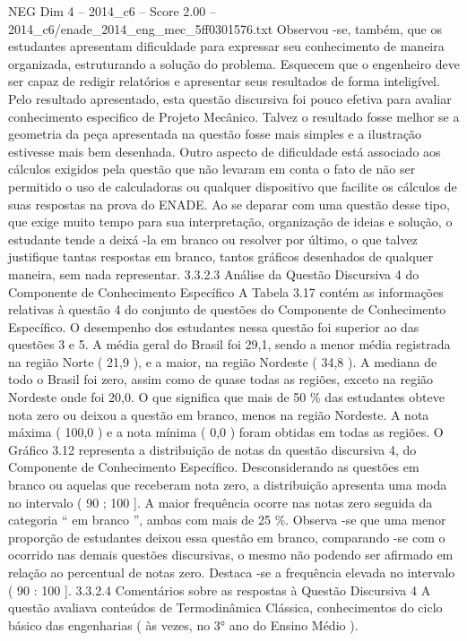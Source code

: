 \begin{textsample}{NEG Dim 4 – 2014\_c6 – Score 2.00 – 2014\_c6/enade\_2014\_eng\_mec\_5ff0301576.txt}
Observou -se, também, que os estudantes apresentam dificuldade para expressar seu conhecimento de maneira organizada, estruturando a solução do problema.
Esquecem que o engenheiro deve ser capaz de redigir relatórios e apresentar seus resultados de forma inteligível.
Pelo resultado apresentado, esta questão discursiva foi pouco efetiva para avaliar conhecimento especifico de Projeto Mecânico.
Talvez o resultado fosse melhor se a geometria da peça apresentada na questão fosse mais simples e a ilustração estivesse mais bem desenhada.
Outro aspecto de dificuldade está associado aos cálculos exigidos pela questão que não levaram em conta o fato de não ser permitido o uso de calculadoras ou qualquer dispositivo que facilite os cálculos de suas respostas na prova do ENADE.
Ao se deparar com uma questão desse tipo, que exige muito tempo para sua interpretação, organização de ideias e solução, o estudante tende a deixá -la em branco ou resolver por último, o que talvez justifique tantas respostas em branco, tantos gráficos desenhados de qualquer maneira, sem nada representar. 3.3.2.3 Análise da Questão Discursiva 4 do Componente de Conhecimento Específico A Tabela 3.17 contém as informações relativas à questão 4 do conjunto de questões do Componente de Conhecimento Específico.
O desempenho dos estudantes nessa questão foi superior ao das questões 3 e 5.
A média geral do Brasil foi 29,1, sendo a menor média registrada na região Norte ( 21,9 ), e a maior, na região Nordeste ( 34,8 ).
A mediana de todo o Brasil foi zero, assim como de quase todas as regiões, exceto na região Nordeste onde foi 20,0.
O que significa que mais de 50 \% das estudantes obteve nota zero ou deixou a questão em branco, menos na região Nordeste.
A nota máxima ( 100,0 ) e a nota mínima ( 0,0 ) foram obtidas em todas as regiões.
O Gráfico 3.12 representa a distribuição de notas da questão discursiva 4, do Componente de Conhecimento Específico.
Desconsiderando as questões em branco ou aquelas que receberam nota zero, a distribuição apresenta uma moda no intervalo ( 90 ; 100 ].
A maior frequência ocorre nas notas zero seguida da categoria “ em branco ”, ambas com mais de 25 \%.
Observa -se que uma menor proporção de estudantes deixou essa questão em branco, comparando -se com o ocorrido nas demais questões discursivas, o mesmo não podendo ser afirmado em relação ao percentual de notas zero.
Destaca -se a frequência elevada no intervalo ( 90 : 100 ]. 3.3.2.4 Comentários sobre as respostas à Questão Discursiva 4 A questão avaliava conteúdos de Termodinâmica Clássica, conhecimentos do ciclo básico das engenharias ( às vezes, no 3{\EmojiFont °} ano do Ensino Médio ).

\end{textsample}
